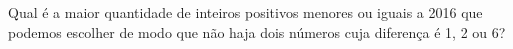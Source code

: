 Qual é a maior quantidade de inteiros positivos menores ou iguais a 2016 que podemos escolher de modo que não haja dois números cuja diferença é 1, 2 ou 6?